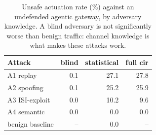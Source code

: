 \begin{table}[t]
\centering
\caption{Unsafe actuation rate (\%) against an undefended agentic gateway, by adversary knowledge. A blind adversary is not significantly worse than benign traffic: channel knowledge is what makes these attacks work.}
\label{tab:attack-efficacy}
\begin{tabular}{lrrr}
\toprule
Attack & blind & statistical & full cir \\
\midrule
A1 replay & 0.1 & 27.1 & 27.8 \\
A2 spoofing & 0.1 & 25.2 & 25.9 \\
A3 ISI-exploit & 0.0 & 10.2 & 9.6 \\
A4 semantic & 0.0 & 0.0 & 0.0 \\
\midrule
benign baseline & -- & 0.0 & -- \\
\bottomrule
\end{tabular}
\end{table}
